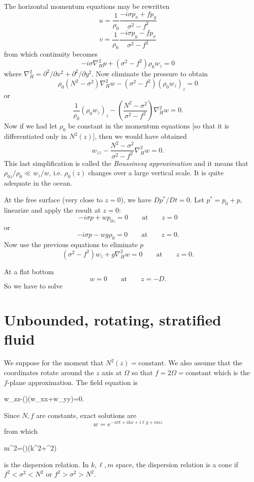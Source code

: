 The horizontal momentum equations may be rewritten
\[
	u=\frac{1}{\rho_0}\frac{-i\sigma p_x+fp_y}{\sigma^2-f^2}
\]
\[
	v=\frac{1}{\rho_0}\frac{-i\sigma p_y-fp_x}{\sigma^2-f^2}
\]
from which continuity becomes
\[
	-i\sigma\nabla_H^2p+(\sigma^2-f^2)\rho_0w_z=0
\]
where $\nabla_H^2=\partial^2/\partial x^2+\partial^2/\partial y^2$. Now eliminate the pressure to obtain
\[
	\rho_0(N^2-\sigma^2)\nabla_H^2w-(\sigma^2-f^2)(\rho_0w_z)_z=0
\]
or
\[
	\frac{1}{\rho_0}(\rho_0w_z)_z
	-\left(\frac{N^2-\sigma^2}{\sigma^2-f^2}\right)\nabla_H^2w=0.
\]
Now if we had let $\rho_0$ be constant in the momentum equations [so that it is
		differentiated only in $N^2(z)$], then we would have obtained
\[
	w_{zz}-\frac{N^2-\sigma^2}{\sigma^2-f^2}\nabla_H^2w=0.
\]
This last simplification is called the \emph{Boussinesq approximation} and it means that
$\rho_{0z}/\rho_0\ll w_z/w$, i.e. $\rho_0(z)$ changes over a large vertical scale. It is quite adequate in
the ocean.

At the free surface (very close to $z=0$), we have $Dp^*/Dt=0$. Let $p^*=p_0+p$,
linearize and apply the result at $z=0$:
\[
	-i\sigma p+w p_{0z}=0\qquad\text{at}\qquad z=0
\]
or
\[
	-i\sigma p-wg\rho_0=0\qquad\text{at}\qquad z=0.
\]
Now use the previous equations to eliminate $p$
\[
	(\sigma^2-f^2)w_z+g\nabla_H^2w=0\qquad\text{at}\qquad z=0.
\]

\sourcepagebreak

At a flat bottom
\[
	w=0\qquad\text{at}\qquad z=-D.
\]
So we have to solve


\section{Unbounded, rotating, stratified fluid}

We suppose for the moment that $N^2(z)=\text{constant}$. We also assume that the
coordinates rotate around the $z$ axis at $\Omega$ so that $f=2\Omega=\text{constant}$ which is the
$f$-plane approximation. The field equation is
\begin{waveequation}
	w_{zz}-\left(\right)(w_{xx}+w_{yy})=0.
\end{waveequation}
Since $N,f$ are constants, exact solutions are
\[
	w=e^{-i\sigma t+ikx+i\ell y+imz}
\]
from which
\begin{waveequation}
	m^2=\left(\right)(k^2+\ell^2)
\end{waveequation}
is the dispersion relation. In $k,\ell,m$ space, the dispersion relation is a cone if
$f^2<\sigma^2<N^2$ or $f^2>\sigma^2>N^2$.

